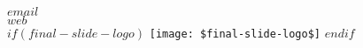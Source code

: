 \begin{frame}
\begin{centering}
\vfill
\faEnvelope \; \textbf{$email$} \\
\vspace{10pt}
\faGlobe \; \textbf{$web$} \\
\vspace{20pt}
$if(final-slide-logo)$
  \texttt{[image: \$final-slide-logo\$]}
$endif$
\vfill
\end{centering}
\end{frame}